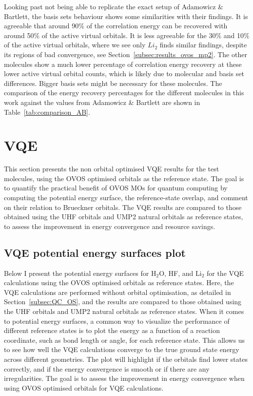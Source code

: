 Looking past not being able to replicate the exact setup of Adamowicz \& Bartlett, the basis sets behaviour shows some similarities with their findings. It is agreeable that around 90\% of the correlation energy can be recovered with around 50\% of the active virtual orbitals. It is less agreeable for the 30\% and 10\% of the active virtual orbitals, where we see only $Li_2$ finds similar findings, despite its regions of bad convergence, see Section~\ref{subsec:results_ovos_mp2}. The other molecules show a much lower percentage of correlation energy recovery at these lower active virtual orbital counts, which is likely due to molecular and basis set differences. Bigger basis sets might be necessary for these molecules. The comparison of the energy recovery percentages for the different molecules in this work against the values from Adamowicz \& Bartlett \cite{Adamowicz1987} are shown in Table~\ref{tab:comparison_AB}.




\section{VQE}
\label{sec:results_veq}

This section presents the non orbital optimised VQE results for the test molecules, using the OVOS optimised orbitals as the reference state. The goal is to quantify the practical benefit of OVOS MOs for quantum computing by computing the potential energy surface, the reference-state overlap, and comment on their relation to Brueckner orbitals. The VQE results are compared to those obtained using the UHF orbitals and UMP2 natural orbitals as reference states, to assess the improvement in energy convergence and resource savings.

\subsection{VQE potential energy surfaces plot}
\label{sec:results_vqe}

Below I present the potential energy surfaces for H$_2$O, HF, and Li$_2$ for the VQE calculations using the OVOS optimised orbitals as reference states. Here, the VQE calculations are performed without orbital optimisation, as detailed in Section~\ref{subsec:QC_OS}, and the results are compared to those obtained using the UHF orbitals and UMP2 natural orbitals as reference states. When it comes to potential energy surfaces, a common way to visualize the performance of different reference states is to plot the energy as a function of a reaction coordinate, such as bond length or angle, for each reference state. This allows us to see how well the VQE calculations converge to the true ground state energy across different geometries. The plot will highlight if the orbitals find lower states correctly, and if the energy convergence is smooth or if there are any irregularities. The goal is to assess the improvement in energy convergence when using OVOS optimised orbitals for VQE calculations.


